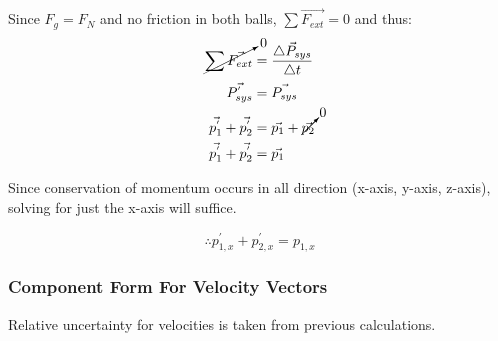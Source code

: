 \documentclass[12pt]{article}
\begin{document}
Since $F_{g} = F_{N}$ and no friction in both balls, $\sum{\vec{F_{ext}}} = 0$ and thus:\\

\begin{align*}
\cancelto{0}{\sum{\vec{F_{ext}}}} &= \frac{\vec{\triangle{P}_{sys}}}{\triangle{t}}\\
\vec{P_{sys}^{'}} &= \vec{P_{sys}}\\
\vec{p_{1}^{'}} + \vec{p_{2}^{'}} &= \vec{p_{1}} + \cancelto{0}{\vec{p_{2}}}\\
\vec{p_{1}^{'}} + \vec{p_{2}^{'}} &= \vec{p_{1}}
\end{align*}

Since conservation of momentum occurs in all direction (x-axis, y-axis, z-axis), solving for just the x-axis will suffice.

$$\therefore{} p_{1,x}^{'} + p_{2,x}^{'} = p_{1,x}$$

\pagebreak

\subsubsection{Component Form For Velocity Vectors}
Relative uncertainty for velocities is taken from previous calculations.
\end{document}
